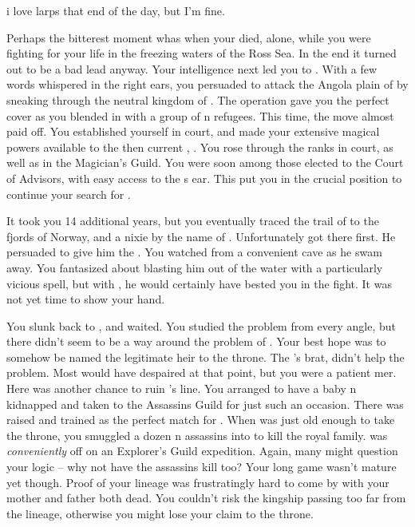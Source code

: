 i love larps that end of the day, but I'm fine.\documentclass[char]{NeptuneBall}
\begin{document}
Perhaps the bitterest moment whas when your \cMother{\parent} died, alone, while you were fighting for your life in the freezing waters of the Ross Sea. In the end it turned out to be a bad lead anyway. Your intelligence next led you to \pAtlantis{}. With a few words whispered in the right ears, you persuaded \pPacifica{} to attack the Angola plain of \pAtlantis{} by sneaking through the neutral kingdom of \pIndia{}. The operation gave you the perfect cover as you blended in with a group of \pAtlantis{}n refugees. This time, the move almost paid off. You established yourself in court, and made your extensive magical powers available to the then current \cExKing{\King}, \cExKing{}. You rose through the ranks in court, as well as in the Magician's Guild. You were soon among those elected to the Court of Advisors, with easy access to the \cExKing{\King}s ear. This put you in the crucial position to continue your search for \iTrident{\MYname}.

It took you 14 additional years, but you eventually traced the trail of  \iTrident{\MYname} to the fjords of Norway, and a nixie by the name of \cNixie{}. Unfortunately \cExKing{} got there first. He persuaded \cNixie{} to give him the \iTrident{\MYname}. You watched from a convenient cave as he swam away. You fantasized about blasting him out of the water with a particularly vicious spell, but with \iTrident{\MYname}, he would certainly have bested you in the fight. It was not yet time to show your hand.

You slunk back to \pAtlantis{}, and waited. You studied the problem from every angle, but there didn't seem to be a way around the problem of \iTrident{\MYname}. Your best hope was to somehow be named the legitimate heir to the throne. The \cExKing{\King}'s brat, \cKing{} didn't help the problem. Most would have despaired at that point, but you were a patient mer\cManta{\human}. Here was another chance to ruin \cExExKing{}'s line. You arranged to have a baby \pAtlantis{}n \cQueen{\kid} kidnapped and taken to the Assassins Guild for just such an occasion. There \cQueen{\they} was raised and trained as the perfect match for \cKing{}. When \cKing{} was just old enough to take the throne, you smuggled a dozen \pPacifica{}n assassins into \pAtlantis{} to kill the royal family. \cKing{} was \emph{conveniently} off on an Explorer's Guild expedition. Again, many might question your logic -- why not have the assassins kill \cKing{} too? Your long game wasn't mature yet though. Proof of your lineage was frustratingly hard to come by with your mother and father both dead. You couldn't risk the kingship passing too far from the \cExExKing{} lineage, otherwise you might lose your claim to the throne.
\end{document}
